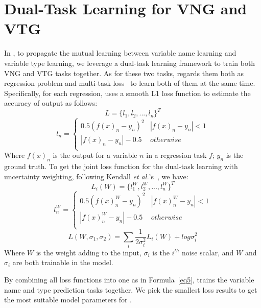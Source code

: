 \section{Dual-Task Learning for VNG and VTG}
\label{sec:dual}

In {\tool}, to propagate the mutual learning between
variable name learning and variable type learning,
we leverage a dual-task learning framework to
train both VNG and VTG tasks together.
As for these two tasks, {\tool} regards them both as regression
problem and multi-task loss~\cite{kendall2018multi} to learn both of
them at the same time. Specifically, for each regression, \tool uses a
smooth L1 loss function to estimate the accuracy of output as follows:
\begin{equation}\label{eq1}
L = \{l_1, l_2, ..., l_n\}^T
\end{equation}
\begin{equation}\label{eq2}
l_n = \left\{ 
	\begin{array}{lr}
    	0.5(f(x)_n-y_n)^2  & |f(x)_n-y_n|<1 \\
   	    |f(x)_n-y_n|-0.5   & otherwise   \\
	\end{array}
\right.
\end{equation}
Where $f(x)_n$ is the output for a variable $n$ in a regression task
$f$; $y_n$ is the ground truth. To get the joint loss function for the
dual-task learning with uncertainty weighting, following Kendall {\em
  et al.}'s~\cite{kendall2018multi}, we have:
\begin{equation}\label{eq3}
L_i(W) = \{l_1^W, l_2^W, ..., l_n^W\}^T
\end{equation}
\begin{equation}\label{eq4}
l_n^W = \left\{ 
	\begin{array}{lr}
		0.5(f(x)^W_n-y_n)^2  & |f(x)^W_n-y_n|<1 \\
		|f(x)^W_n-y_n|-0.5   & otherwise   \\
	\end{array}
\right.
\end{equation}
\begin{equation}\label{eq5}
L(W, \sigma_1, \sigma_2) = \sum_i\frac{1}{2\sigma_i^2}L_i(W) + log \sigma^2_i
\end{equation}
Where $W$ is the weight adding to the input, $\sigma_i$ is the $i^{th}$ noise scalar, and $W$ and $\sigma_i$ are both trainable in the model.

By combining all loss functions into one as in Formula~\ref{eq5}, {\tool} trains the variable name and type prediction tasks together. We pick the smallest loss results to get the most suitable model parameters for {\tool}.
